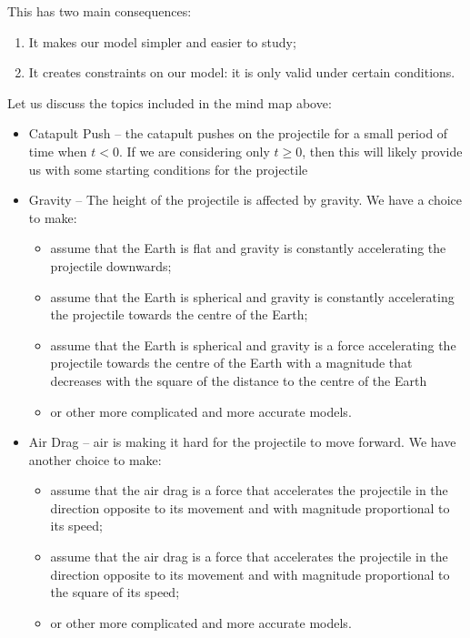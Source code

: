 This has two main consequences:
\begin{enumerate}
	\item It makes our model simpler and easier to study;
	\item It creates constraints on our model: it is only valid under certain conditions.
\end{enumerate}

\begin{example}

Let us discuss the topics included in the mind map above:
\begin{itemize}
	\item Catapult Push -- the catapult pushes on the projectile for a small period of time when $t<0$. If we are considering only $t\geq 0$, then this will likely provide us with some starting conditions for the projectile
	\item Gravity -- The height of the projectile is affected by gravity. We have a choice to make:
	\begin{itemize}
		\item assume that the Earth is flat and gravity is constantly accelerating the projectile downwards;
		\item assume that the Earth is spherical and gravity is constantly accelerating the projectile towards the centre of the Earth;
		\item assume that the Earth is spherical and gravity is a force accelerating the projectile towards the centre of the Earth with a magnitude that decreases with the square of the distance to the centre of the Earth
		\item or other more complicated and more accurate models.
	\end{itemize}
	
	\item Air Drag -- air is making it hard for the projectile to move forward. We have another choice to make:
	\begin{itemize}
		\item assume that the air drag is a force that accelerates the projectile in the direction opposite to its movement and with magnitude proportional to its speed;
		\item assume that the air drag is a force that accelerates the projectile in the direction opposite to its movement and with magnitude proportional to the square of its speed;
		\item or other more complicated and more accurate models.
	\end{itemize}
\end{itemize}
	

\end{example}

